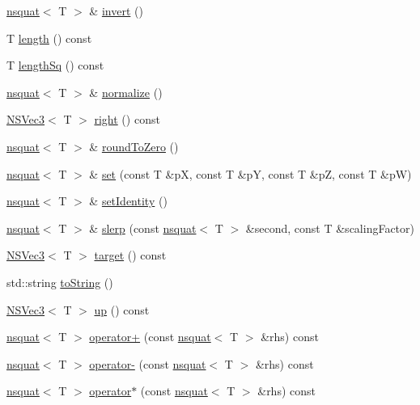 \begin{DoxyCompactItemize}
\item 
\hyperlink{structnsquat}{nsquat}$<$ T $>$ \& \hyperlink{structnsquat_a46f99264a9460c1e53388338dd1f8726}{invert} ()
\item 
T \hyperlink{structnsquat_a31109b1efdc7d1fc4a7df803538b4acf}{length} () const 
\item 
T \hyperlink{structnsquat_a139b842a9481dbcc653cee6d15643ebe}{length\-Sq} () const 
\item 
\hyperlink{structnsquat}{nsquat}$<$ T $>$ \& \hyperlink{structnsquat_af23ab6c9ec2ed7772e8da3a4229c7226}{normalize} ()
\item 
\hyperlink{structNSVec3}{N\-S\-Vec3}$<$ T $>$ \hyperlink{structnsquat_acaf8e5c49377e88d8bb548b842e628db}{right} () const 
\item 
\hyperlink{structnsquat}{nsquat}$<$ T $>$ \& \hyperlink{structnsquat_a29e34aabab642e19b6e5934d922af886}{round\-To\-Zero} ()
\item 
\hyperlink{structnsquat}{nsquat}$<$ T $>$ \& \hyperlink{structnsquat_a7647333dd8b755b378fd6d9b92c6ff74}{set} (const T \&p\-X, const T \&p\-Y, const T \&p\-Z, const T \&p\-W)
\item 
\hyperlink{structnsquat}{nsquat}$<$ T $>$ \& \hyperlink{structnsquat_a9fd0037a8d206d423038ce7f0cf676d0}{set\-Identity} ()
\item 
\hyperlink{structnsquat}{nsquat}$<$ T $>$ \& \hyperlink{structnsquat_aff272165e0866bcbeae706d523d6c96c}{slerp} (const \hyperlink{structnsquat}{nsquat}$<$ T $>$ \&second, const T \&scaling\-Factor)
\item 
\hyperlink{structNSVec3}{N\-S\-Vec3}$<$ T $>$ \hyperlink{structnsquat_ad3a425484af363fd1f3f624649ffa8f7}{target} () const 
\item 
std\-::string \hyperlink{structnsquat_a6abf9e2ecba557cbc92c069ae3080842}{to\-String} ()
\item 
\hyperlink{structNSVec3}{N\-S\-Vec3}$<$ T $>$ \hyperlink{structnsquat_aaaf256f452048d3507de00ed3ee2e042}{up} () const 
\item 
\hyperlink{structnsquat}{nsquat}$<$ T $>$ \hyperlink{structnsquat_a03146d1b1bad376e72e87553c48d766d}{operator+} (const \hyperlink{structnsquat}{nsquat}$<$ T $>$ \&rhs) const 
\item 
\hyperlink{structnsquat}{nsquat}$<$ T $>$ \hyperlink{structnsquat_a6c06aa64f8ec42ce072ca6b1b6ff62d1}{operator-\/} (const \hyperlink{structnsquat}{nsquat}$<$ T $>$ \&rhs) const 
\item 
\hyperlink{structnsquat}{nsquat}$<$ T $>$ \hyperlink{structnsquat_ad65c7cdc47a109d00019225276c5d6fd}{operator$\ast$} (const \hyperlink{structnsquat}{nsquat}$<$ T $>$ \&rhs) const 

\end{DoxyCompactItemize}
